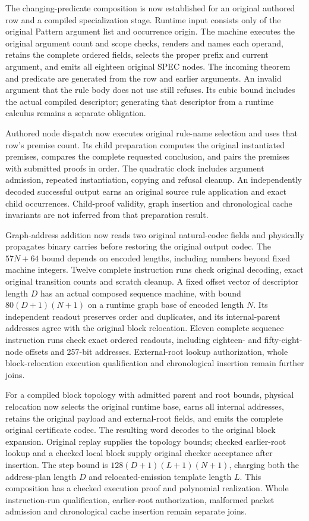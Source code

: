 \documentclass[11pt]{article}
\begin{document}
The changing-predicate composition is now established for an original
authored row and a compiled specialization stage. Runtime input consists
only of the original Pattern argument list and occurrence origin. The
machine executes the original argument count and scope checks, renders and
names each operand, retains the complete ordered fields, selects the proper
prefix and current argument, and emits all eighteen original SPEC nodes.
The incoming theorem and predicate are generated from the row and earlier
arguments. An invalid argument that the rule body does not use still
refuses. Its cubic bound includes the actual compiled descriptor; generating
that descriptor from a runtime calculus remains a separate obligation.

Authored node dispatch now executes original rule-name selection and uses
that row's premise count. Its child preparation computes the original
instantiated premises, compares the complete requested conclusion, and
pairs the premises with submitted proofs in order. The quadratic clock
includes argument admission, repeated instantiation, copying and refusal
cleanup. An independently decoded successful output earns an original
source rule application and exact child occurrences. Child-proof validity,
graph insertion and chronological cache invariants are not inferred from
that preparation result.

Graph-address addition now reads two original natural-codec fields and
physically propagates binary carries before restoring the original output
codec. The $57N+64$ bound depends on encoded lengths, including numbers
beyond fixed machine integers. Twelve complete instruction runs check
original decoding, exact original transition counts and scratch cleanup.
A fixed offset vector of descriptor length $D$ has an actual composed
sequence machine, with bound $80(D+1)(N+1)$ on a runtime graph base of
encoded length $N$. Its independent readout preserves order and duplicates,
and its internal-parent addresses agree with the original block relocation.
Eleven complete sequence instruction runs check exact ordered readouts,
including eighteen- and fifty-eight-node offsets and 257-bit addresses.
External-root lookup authorization, whole block-relocation execution
qualification and chronological insertion remain further joins.

For a compiled block topology with admitted parent and root bounds, physical
relocation now selects the original runtime base, earns all internal
addresses, retains the original payload and external-root fields, and emits
the complete original certificate codec. The resulting word decodes to the
original block expansion. Original replay supplies the topology bounds;
checked earlier-root lookup and a checked local block supply original
checker acceptance after insertion. The step bound is
$128(D+1)(L+1)(N+1)$, charging both the address-plan length $D$ and
relocated-emission template length $L$. This composition has a checked
execution proof and polynomial realization. Whole instruction-run
qualification, earlier-root authorization, malformed packet admission and
chronological cache insertion remain separate joins.
\end{document}
